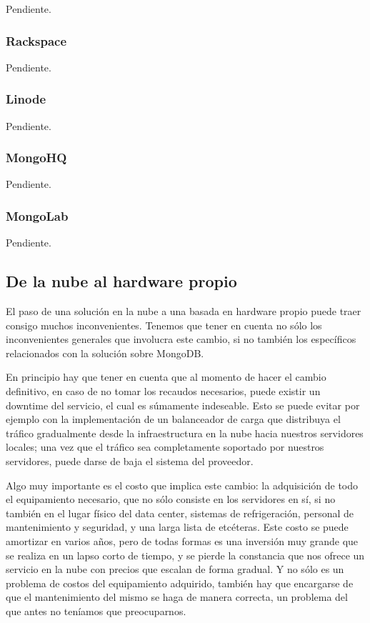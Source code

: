 \documentclass[a4paper,10pt,twoside]{article}
\begin{document}
Pendiente.


\subsubsection{Rackspace}

Pendiente.


\subsubsection{Linode}

Pendiente.


\subsubsection{MongoHQ}

Pendiente.


\subsubsection{MongoLab}

Pendiente.


\subsection{De la nube al hardware propio}

El paso de una solución en la nube a una basada en hardware propio puede traer consigo muchos inconvenientes. Tenemos que tener en cuenta no sólo los inconvenientes generales que involucra este cambio, si no también los específicos relacionados con la solución sobre MongoDB.

En principio hay que tener en cuenta que al momento de hacer el cambio definitivo, en caso de no tomar los recaudos necesarios, puede existir un downtime del servicio, el cual es súmamente indeseable. Esto se puede evitar por ejemplo con la implementación de un balanceador de carga que distribuya el tráfico gradualmente desde la infraestructura en la nube hacia nuestros servidores locales; una vez que el tráfico sea completamente soportado por nuestros servidores, puede darse de baja el sistema del proveedor.

Algo muy importante es el costo que implica este cambio: la adquisición de todo el equipamiento necesario, que no sólo consiste en los servidores en sí, si no también en el lugar físico del data center, sistemas de refrigeración, personal de mantenimiento y seguridad, y una larga lista de etcéteras. Este costo se puede amortizar en varios años, pero de todas formas es una inversión muy grande que se realiza en un lapso corto de tiempo, y se pierde la constancia que nos ofrece un servicio en la nube con precios que escalan de forma gradual. Y no sólo es un problema de costos del equipamiento adquirido, también hay que encargarse de que el mantenimiento del mismo se haga de manera correcta, un problema del que antes no teníamos que preocuparnos.
\end{document}
